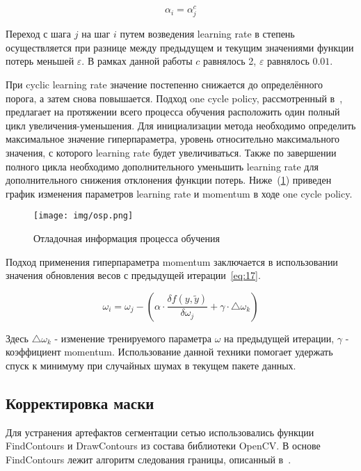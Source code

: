 \begin{equation}
    \label{eq:15}
    \alpha_{i} = \alpha_{j}^{c}
\end{equation}

Переход с шага $j$ на шаг $i$ путем возведения learning rate в степень осуществляется при разнице между предыдущем
и текущим значениями функции потерь меньшей $\varepsilon$.
В рамках данной работы $c$ равнялось 2, $\varepsilon$ равнялось $0.01$.

При cyclic learning rate значение постепенно снижается до определённого порога, а затем снова повышается.
Подход one cycle policy, рассмотренный в~\autocite{smith2018disciplined}, предлагает на протяжении всего процесса обучения расположить один полный цикл увеличения-уменьшения.
Для инициализации метода необходимо определить максимальное значение гиперпараметра, уровень относительно максимального значения, с которого learning rate будет увеличиваться.
Также по завершении полного цикла необходимо дополнительного уменьшить learning rate для дополнительного снижения отклонения функции потерь.
Ниже~(\ref{fig:osp}) приведен график изменения параметров learning rate и momentum в ходе one cycle policy.

\begin{figure}[H]
    \centering
    \texttt{[image: img/osp.png]}
    \caption{Отладочная информация процесса обучения}
    \label{fig:osp}
\end{figure}

Подход применения гиперпараметра momentum заключается в использовании значения обновления весов с предыдущей итерации~\eqref{eq:17}.

\begin{equation}
    \label{eq:17}
    \omega_{i} = \omega_{j} - (\alpha \cdot \frac{\delta f(y, \tilde{y})}{\delta \omega_{j}} + \gamma \cdot \bigtriangleup \omega_{k})
\end{equation}

Здесь $\bigtriangleup \omega_{k}$ - изменение тренируемого параметра $\omega$ на предыдущей итерации, $\gamma$ - коэффициент momentum.
Использование данной техники помогает удержать спуск к минимуму при случайных шумах в текущем пакете данных.

\subsection{Корректировка маски}

Для устранения артефактов сегментации сетью использовались функции FindContours и DrawContours из состава библиотеки OpenCV\@.
В основе FindContours лежит алгоритм следования границы, описанный в~\autocite{Suzuki1985TopologicalSA}.


